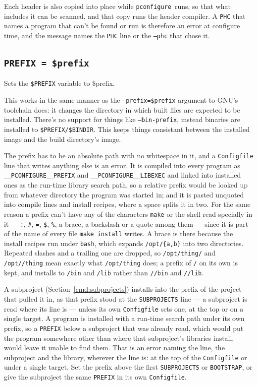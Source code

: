 \documentclass{article}
\newcommand{\pconfigure}{\texttt{pconfigure}}
\begin{document}
Each header is also copied into place while \pconfigure\ runs, so
that what includes it can be scanned, and that copy runs the header
compiler.  A \texttt{PHC} that names a program that can't be found or
run is therefore an error at configure time, and the message names the
\texttt{PHC} line or the \texttt{--phc} that chose it.

\subsection{\texttt{PREFIX = \$prefix}}

Sets the \texttt{\$PREFIX} variable to \$prefix.

This works in the same manner as the \texttt{--prefix=\$prefix}
argument to GNU's toolchain does: it changes the directory in which
built files are expected to be installed.  There's no support for
things like \texttt{--bin-prefix}, instead binaries are installed to
\texttt{\$PREFIX/\$BINDIR}.  This keeps things consistant between the
installed image and the build directory's image.

The prefix has to be an absolute path with no whitespace in it, and a
\texttt{Configfile} line that writes anything else is an error.  It is
compiled into every program as \texttt{\_\_PCONFIGURE\_\_PREFIX} and
\texttt{\_\_PCONFIGURE\_\_LIBEXEC} and linked into installed ones as
the run-time library search path, so a relative prefix would be looked
up from whatever directory the program was started in; and it is
pasted unquoted into compile lines and install recipes, where a space
splits it in two.  For the same reason a prefix can't have any of the
characters \texttt{make} or the shell read specially in it ---
\texttt{:}, \texttt{\#}, \texttt{=}, \texttt{\$}, \texttt{\%},
a brace, a backslash or a quote among them --- since it is part of the
name of every file \texttt{make install} writes.  A brace is there
because the install recipes run under \texttt{bash}, which expands
\texttt{/opt/\{a,b\}} into two directories.  Repeated slashes and a trailing one are dropped, so
\texttt{/opt/thing/} and \texttt{/opt//thing} mean exactly what
\texttt{/opt/thing} does; a prefix of \texttt{/} on its own is kept,
and installs to \texttt{/bin} and \texttt{/lib} rather than
\texttt{//bin} and \texttt{//lib}.

A subproject (Section~\ref{cmd:subprojects}) installs into the prefix
of the project that pulled it in, as that prefix stood at the
\texttt{SUBPROJECTS} line --- a subproject is read where its line is
--- unless its own \texttt{Configfile} sets one, at the top or on a
single target.  A program is installed with a run-time search path
under its own prefix, so a \texttt{PREFIX} below a subproject that was
already read, which would put the program somewhere other than where
that subproject's libraries install, would leave it unable to find
them.  That is an error naming the line, the subproject and the
library, wherever the line is: at the top of the \texttt{Configfile} or
under a single target.  Set the prefix above the first
\texttt{SUBPROJECTS} or \texttt{BOOTSTRAP}, or give the subproject the
same \texttt{PREFIX} in its own \texttt{Configfile}.
\end{document}
